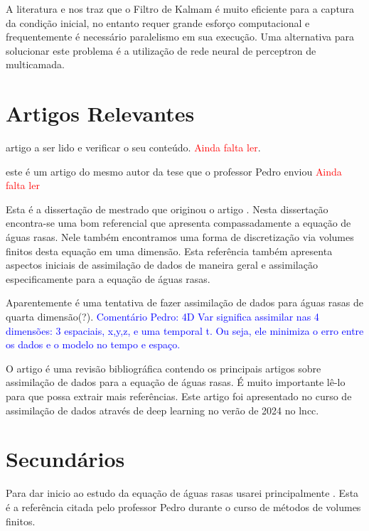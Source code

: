 \documentclass[12pt,a4paper]{article}
\begin{document}
	A literatura  \cite{HARTER20082621} e \cite{CampusVelhoHarter} nos traz que o Filtro de Kalmam é muito eficiente para a captura da condição inicial, no entanto requer grande esforço computacional e frequentemente é necessário paralelismo em sua execução. Uma alternativa para solucionar este problema é a utilização de rede neural de perceptron de  multicamada. 
	
	
	\section{Artigos Relevantes}
	
	\cite{kochkov2023neural} artigo a ser lido e verificar o seu conteúdo. \textcolor{red}{Ainda falta ler}.
	
	\cite{artigo2021fabioamaral} este é um artigo do mesmo autor da tese que o professor Pedro enviou \textcolor{red}{Ainda falta ler}
	
	\cite{disertacaoKhan} Esta é a dissertação de mestrado que originou o artigo \cite{kevlahan2019convergence}. Nesta dissertação encontra-se uma bom referencial que apresenta compassadamente a equação de águas rasas. Nele também encontramos uma forma de discretização via volumes finitos desta equação em uma dimensão. Esta referência também apresenta aspectos iniciais de assimilação de dados de maneira geral e assimilação especificamente para a equação de águas rasas.
	
	
	\cite{cstefuanescu2015pod} Aparentemente é uma tentativa de fazer assimilação de dados para águas rasas de quarta dimensão(?).
	\textcolor{blue}{Comentário Pedro: 4D Var significa assimilar nas 4 dimensões: 3 espaciais, x,y,z, e uma temporal t. Ou seja, ele minimiza o erro entre os dados e o modelo no tempo e espaço.}
	
	O artigo \cite{ghorbani2023data} é uma revisão bibliográfica contendo os principais artigos sobre assimilação de dados para a equação de águas rasas. É muito importante lê-lo para que possa extrair mais referências. Este artigo foi apresentado no curso de assimilação de dados através de deep learning no verão de 2024 no lncc.
	
	\section{Secundários}
	
	Para dar inicio ao estudo da equação de águas rasas usarei principalmente \cite{vallis2017atmospheric}. Esta é a referência citada pelo professor Pedro durante o curso de métodos de volumes finitos.
	
\end{document}
